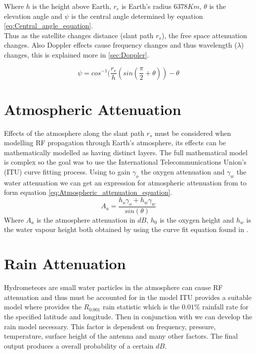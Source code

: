 \documentclass[conference]{IEEEtran}
\begin{document}
Where $h$ is the height above Earth, $r_e$ is Earth's radius $6378K m$, $\theta$ is the elevation angle and $\psi$ is the central angle determined by equation \ref{eq:Central_angle_equation}.\\

Thus as the satellite changes distance (slant path $r_s$), the free space attenuation changes. Also Doppler effects cause frequency changes and thus wavelength ($\lambda$) changes, this is explained more in \ref{sec:Doppler}.  

\begin{equation}
\psi = cos^{-1}(\frac{r_e}{h}(sin(\frac{\pi}{2}+\theta))-\theta
\label{eq:Central_angle_equation}
\end{equation}

\label{sec:Free_space}

\section{Atmospheric Attenuation}
Effects of the atmosphere along the slant path $r_s$ must be considered when modelling RF propagation through Earth's atmosphere, its effects can be mathematically modelled as having distinct layers. The full mathematical model is complex so the goal was to use the International Telecommunications Union's (ITU) curve fitting process. Using \cite{ITU-R_P.676-5} to gain $\gamma_{o}$ the oxygen attenuation and $\gamma_w$ the water attenuation we can get an expression for atmospheric attenuation from \cite{ITU-R_P.618-7} to form equation \ref{eq:Atmospheric_attenuation_equation}.
\begin{equation}
A_a = \frac{h_o \gamma_o + h_w \gamma_w}{sin(\theta)}
\label{eq:Atmospheric_attenuation_equation}
\end{equation}
Where $A_a$ is the atmosphere attenuation in $dB$, $h_0$ is the oxygen height and $h_w$ is the water vapour height both obtained by using the curve fit equation found in \cite{ITU-R_P.618-7}.

\label{sec:Atmosphere}

\section{Rain Attenuation}
Hydrometeors are small water particles in the atmosphere can cause RF attenuation and thus must be accounted for in the model ITU provides a suitable model where \cite{ITU-R_P.837-1} provides the $R_{0.001}$ rain statistic which is the $0.01\%$ rainfall rate for the specified latitude and longitude. Then in conjunction with \cite{ITU-R_P.618-7} we can develop the rain model necessary. This factor is dependent on frequency, pressure, temperature, surface height of the antenna and many other factors. The final output produces a overall probability of a certain $dB$.\\
\end{document}

